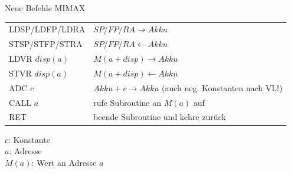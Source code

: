 \begin{frame}{Neue Befehle MIMAX}

\begin{tabular}{|l|l|}
			\toprule
				LDSP/LDFP/LDRA & $SP/FP/RA \rightarrow Akku$ \\
				STSP/STFP/STRA & $SP/FP/RA \leftarrow Akku$ \\
				LDVR $disp(a)$ & $M(a+disp) \rightarrow Akku$ \\
				STVR $disp(a)$ & $M(a+disp) \leftarrow Akku$ \\
				\midrule
				ADC $c$ & $Akku + c \rightarrow Akku$ (auch neg. Konstanten nach VL!)\\
				\midrule
				CALL $a$ & rufe Subroutine an $M(a)$ auf\\
				RET & beende Subroutine und kehre zurück\\
			\bottomrule	
		\end{tabular}

\bigskip

$c$: Konstante \\
$a$: Adresse \\
$M(a)$: Wert an Adresse $a$
	
\end{frame}


